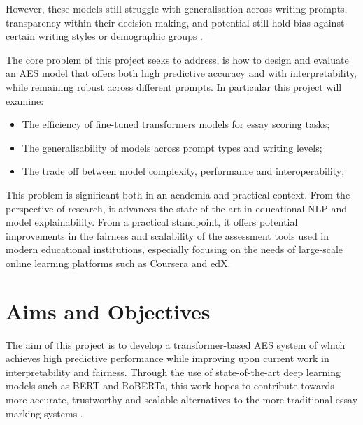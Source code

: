 \documentclass[12pt,a4paper]{report}
\begin{document}
However, these models still struggle with generalisation across writing prompts, transparency within their decision-making, and potential still hold bias against certain writing styles or demographic groups \cite{beigman2021limitations}.

The core problem of this project seeks to address, is how to design and evaluate an AES model that offers both high predictive accuracy and with interpretability, while remaining robust across different prompts. In particular this project will examine:

\begin{itemize}
    \item The efficiency of fine-tuned transformers models for essay scoring tasks;
    \item The generalisability of models across prompt types and writing levels;
    \item The trade off between model complexity, performance and interoperability;
\end{itemize}

This problem is significant both in an academia and practical context. From the perspective of research, it advances the state-of-the-art in educational NLP and model explainability. From a practical standpoint, it offers potential improvements in the fairness and scalability of the assessment tools used in modern educational institutions, especially focusing on the needs of large-scale online learning platforms such as Coursera and edX.


\section{Aims and Objectives}
The aim of this project is to develop a transformer-based AES system of which achieves high predictive performance while improving upon current work in interpretability and fairness. Through the use of state-of-the-art deep learning models such as BERT and RoBERTa, this work hopes to contribute towards more accurate, trustworthy and scalable alternatives to the more traditional essay marking systems \citep{devlin2019bert}.
\end{document}
